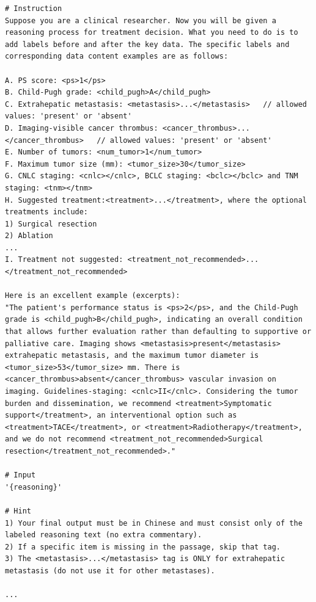 \documentclass{article}
\begin{document}
\begin{appendices}
\begin{lstlisting}[style=promptmono,floatplacement=H,caption={Tagging prompt (the complete prompt is provided in Supplementary Materials)},label={lst:tag_en_full}]
# Instruction
Suppose you are a clinical researcher. Now you will be given a reasoning process for treatment decision. What you need to do is to add labels before and after the key data. The specific labels and corresponding data content examples are as follows:

A. PS score: <ps>1</ps>
B. Child-Pugh grade: <child_pugh>A</child_pugh>
C. Extrahepatic metastasis: <metastasis>...</metastasis>   // allowed values: 'present' or 'absent'
D. Imaging-visible cancer thrombus: <cancer_thrombus>...</cancer_thrombus>   // allowed values: 'present' or 'absent'
E. Number of tumors: <num_tumor>1</num_tumor>
F. Maximum tumor size (mm): <tumor_size>30</tumor_size>
G. CNLC staging: <cnlc></cnlc>, BCLC staging: <bclc></bclc> and TNM staging: <tnm></tnm> 
H. Suggested treatment:<treatment>...</treatment>, where the optional treatments include:
1) Surgical resection
2) Ablation
...
I. Treatment not suggested: <treatment_not_recommended>...</treatment_not_recommended>

Here is an excellent example (excerpts):
"The patient's performance status is <ps>2</ps>, and the Child-Pugh grade is <child_pugh>B</child_pugh>, indicating an overall condition that allows further evaluation rather than defaulting to supportive or palliative care. Imaging shows <metastasis>present</metastasis> extrahepatic metastasis, and the maximum tumor diameter is <tumor_size>53</tumor_size> mm. There is <cancer_thrombus>absent</cancer_thrombus> vascular invasion on imaging. Guidelines-staging: <cnlc>II</cnlc>. Considering the tumor burden and dissemination, we recommend <treatment>Symptomatic support</treatment>, an interventional option such as <treatment>TACE</treatment>, or <treatment>Radiotherapy</treatment>, and we do not recommend <treatment_not_recommended>Surgical resection</treatment_not_recommended>."

# Input
'{reasoning}'

# Hint
1) Your final output must be in Chinese and must consist only of the labeled reasoning text (no extra commentary).
2) If a specific item is missing in the passage, skip that tag.
3) The <metastasis>...</metastasis> tag is ONLY for extrahepatic metastasis (do not use it for other metastases).

...
\end{lstlisting}


\end{appendices}
\end{document}
